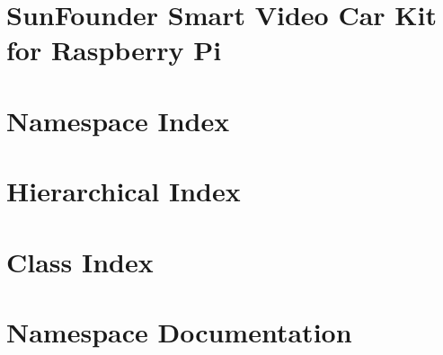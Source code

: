 \let\mypdfximage\pdfximage\def\pdfximage{\immediate\mypdfximage}\documentclass[twoside]{book}
\newcommand{\+}{\discretionary{\mbox{\scriptsize$\hookleftarrow$}}{}{}}
\begin{document}
\chapter{Sun\+Founder Smart Video Car Kit for Raspberry Pi}
\label{md_src_picar__module__sun_founder__pi_car__v__r_e_a_d_m_e}

\chapter{Namespace Index}

\chapter{Hierarchical Index}

\chapter{Class Index}

\chapter{Namespace Documentation}















\end{document}
